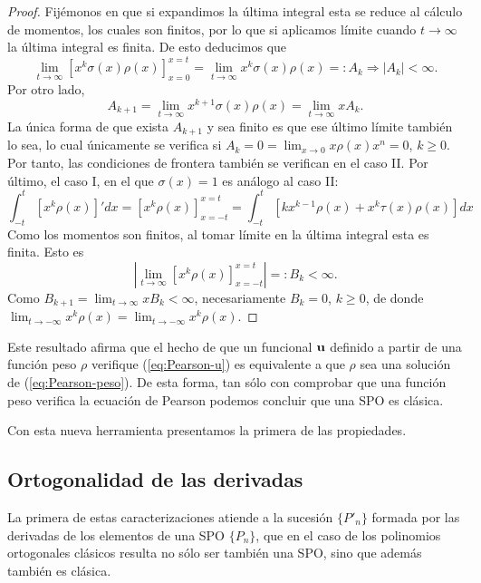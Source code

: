 \begin{proof}
    Fijémonos en que si expandimos la última integral esta se reduce al cálculo de momentos, los cuales son finitos, por lo que si aplicamos límite cuando $t\rightarrow\infty$ la última integral es finita. De esto deducimos que 
    $$
    \lim_{t\rightarrow\infty} \left[x^k\sigma(x)\rho(x)\right]_{x=0}^{x=t} =  \lim_{t\rightarrow\infty} x^k\sigma(x)\rho(x) =: A_k \Rightarrow |A_k|< \infty.
    $$
    Por otro lado,
    $$
    A_{k+1}= \lim_{t\rightarrow\infty} x^{k+1}\sigma(x)\rho(x) = \lim_{t\rightarrow\infty} x A_k.
    $$
    La única forma de que exista $A_{k+1}$ y sea finito es que ese último límite también lo sea, lo cual únicamente se verifica si $A_k=0=\displaystyle\lim_{x\rightarrow 0} x\rho(x)x^n = 0$, $k\geq 0$. Por tanto, las condiciones de frontera también se verifican en el caso II.
    Por último, el caso I, en el que $\sigma(x)=1$ es análogo al caso II:
    \begin{equation*}
        \int_{-t}^t [x^k\rho(x)]'dx = \left[x^k\rho(x)\right]_{x=-t}^{x=t} = \int_{-t}^t[kx^{k-1}\rho(x)+x^k\tau(x)\rho(x)]  dx
    \end{equation*}
    Como los momentos son finitos, al tomar límite en la última integral esta es finita. Esto es
    $$
    \left|\lim_{t\rightarrow\infty}\left[x^k\rho(x)\right]_{x=-t}^{x=t}\right|=: B_k < \infty.
    $$
    Como $B_{k+1}=\displaystyle\lim_{t\rightarrow\infty} x B_k < \infty$, necesariamente $B_k=0$, $k\geq 0$, de donde $\displaystyle\lim_{t\rightarrow-\infty}x^k\rho(x)=\displaystyle\lim_{t\rightarrow-\infty}x^k\rho(x)$.
\end{proof}

Este resultado afirma que el hecho de que un funcional $\mathbf{u}$ definido a partir de una función peso $\rho$ verifique (\ref{eq:Pearson-u}) es equivalente a que $\rho$ sea una solución de (\ref{eq:Pearson-peso}). De esta forma, tan sólo con comprobar que una función peso verifica la ecuación de Pearson podemos concluir que una SPO es clásica.

Con esta nueva herramienta presentamos la primera de las propiedades.

\subsection{Ortogonalidad de las derivadas}

La primera de estas caracterizaciones atiende a la sucesión $\{P'_n\}$ formada por las derivadas de los elementos de una SPO $\{P_n\}$, que en el caso de los polinomios ortogonales clásicos resulta no sólo ser también una SPO, sino que además también es clásica.

